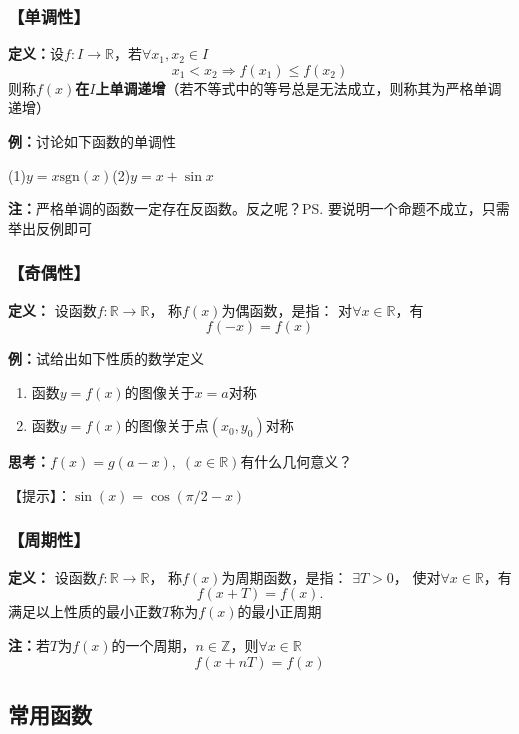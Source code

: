 \subsubsection{【单调性】}

{{\bf 定义：}}设$f:I\to\mathbb{R}$，若$\forall x_1,x_2\in I$
$$x_1<x_2\Rightarrow f(x_1)\leq f(x_2)$$
则称{\bf $f(x)$在$I$上单调递增}（若不等式中的等号总是无法成立，则称其为严格单调递增）
	
{{\bf 例：}讨论如下函数的单调性}

	\quad(1)\;$y=x\mathrm{sgn}(x)$\hspace{3cm}(2)\;$y=x+\sin x$

{\bf 注：}严格单调的函数一定存在反函数。反之呢？\ps{要说明一个命题不成立，只需举出反例即可}

\subsubsection{【奇偶性】}

{{\bf 定义：}}
	设函数$f:\mathbb{R}\to\mathbb{R}$，
	{\bb 称$f(x)$为偶函数}，是指： 对$\forall x\in\mathbb{R}$，有
	$$f(-x)=f(x)$$

{{\bf 例：}试给出如下性质的数学定义}
\begin{enumerate}[(1)]
  \setlength{\itemindent}{1cm}
  \item 函数$y=f(x)$的图像关于$x=a$对称
  \item 函数$y=f(x)$的图像关于点$(x_0,y_0)$对称
\end{enumerate}

{{\bf 思考：}$f(x)=g(a-x),\;(x\in\mathbb{R})$有什么几何意义？}

【提示】：$\sin(x)=\cos(\pi/2-x)$

\subsubsection{【周期性】}

{{\bf 定义：}}
设函数$f:\mathbb{R}\to\mathbb{R}$，
称{\bb $f(x)$为周期函数}，是指： $\exists T>0$，
使对$\forall x\in\mathbb{R}$，有
$$f(x+T)=f(x).$$
 满足以上性质的最小正数$T$称为$f(x)$的{\bb 最小正周期}
		 
{\bf 注：}若$T$为$f(x)$的一个周期，$n\in\mathbb{Z}$，则$\forall x\in\mathbb{R}$
$$f(x+nT)=f(x)$$

\subsection{常用函数}

